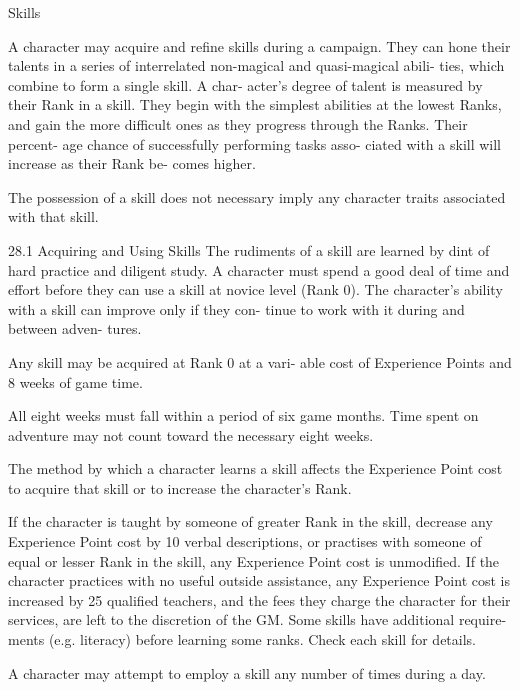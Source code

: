 \begin{Chapter}{Skills}

A character may acquire and refine  skills during a 
campaign. They can hone their talents in a series of 
interrelated  non-magical  and  quasi-magical  abili-
ties, which combine to form a single skill. A char-
acter’s  degree  of  talent  is  measured  by  their  Rank 
in a skill. They begin  with the simplest abilities at 
the lowest Ranks, and gain the more difficult ones 
as they progress through the Ranks. Their percent-
age  chance  of  successfully  performing  tasks  asso-
ciated  with  a  skill  will  increase  as  their  Rank  be-
comes higher. 

The possession of a skill does not necessary imply 
any character traits associated with that skill. 

28.1 Acquiring and Using Skills 
The rudiments of a skill are learned by dint of hard 
practice and diligent study. A character must spend 
a good deal of time and effort before they can use a 
skill  at  novice  level  (Rank  0).  The  character’s 
ability  with  a  skill  can  improve  only  if  they  con-
tinue  to  work  with  it  during  and  between  adven-
tures. 

Any  skill  may  be acquired at  Rank  0  at  a  vari-
able  cost  of  Experience  Points  and  8  weeks  of 
game time. 

All  eight  weeks  must  fall  within  a  period  of  six 
game  months.  Time  spent  on  adventure  may  not 
count toward the necessary eight weeks. 

The method by which a character learns a skill 
affects the Experience Point cost to acquire that 
skill or to increase the character’s Rank. 

If  the  character  is  taught  by  someone  of  greater 
Rank  in  the  skill,  decrease  any  Experience  Point 
cost  by  10%
verbal  descriptions,  or  practises  with  someone  of 
equal  or  lesser  Rank  in  the  skill,  any  Experience 
Point cost is unmodified. If the character practices 
with  no  useful  outside  assistance,  any  Experience 
Point cost is increased by 25%
qualified  teachers,  and  the  fees  they  charge  the 
character for their services, are left to the discretion 
of  the  GM.  Some  skills  have  additional  require-
ments  (e.g.  literacy)  before  learning  some  ranks. 
Check each skill for details. 

A  character  may  attempt  to  employ  a  skill  any 
number of times during a day. 


\end{Chapter}
